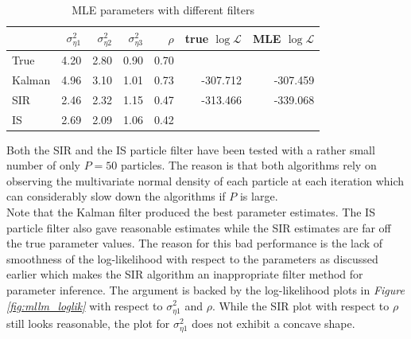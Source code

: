 \documentclass[11pt, oneside]{scrreprt}   	%
\begin{document}
\begin{table}[h!]
\centering
\begin{tabular}{l r r r r r r}
\hline
& $\sigma_{\eta 1}^2$ &  $\sigma_{\eta 2}^2$ & $\sigma_{\eta 3}^2$ & $\rho$ & true $\log \mathcal{L} $ & MLE $\log \mathcal{L} $ \\
\hline
True        & 4.20  & 2.80 &  0.90 & 0.70&  &  \\
Kalman   & 4.96  & 3.10  & 1.01 & 0.73 & -307.712 & -307.459 \\
SIR         & 2.46  & 2.32  & 1.15 & 0.47 & -313.466 & -339.068 \\
IS            & 2.69  & 2.09  & 1.06 & 0.42 &  & \\
\hline
\end{tabular}
\caption{MLE parameters with different filters}
\label{tab:mllm_param_inference}
\end{table}
Both the SIR and the IS particle filter have been tested with a rather small number of only $P=50$ particles. The reason is that both algorithms rely on observing the multivariate normal density of each particle at each iteration which can considerably slow down the algorithms if $P$ is large. \\                              
    
Note that the Kalman filter produced the best parameter estimates. The IS particle filter also gave reasonable estimates while the SIR estimates are far off the true parameter values. The reason for this bad performance is the lack of smoothness of the log-likelihood with respect to the parameters as discussed earlier which makes the SIR algorithm an inappropriate filter method for parameter inference. The argument is backed by the log-likelihood plots in \textit{Figure \ref{fig:mllm_loglik}} with respect to $\sigma_{\eta 1}^2$ and $\rho$. While the SIR plot with respect to $\rho$ still looks reasonable, the plot for $\sigma_{\eta 1}^2$ does not exhibit a concave shape.\\
\end{document}
